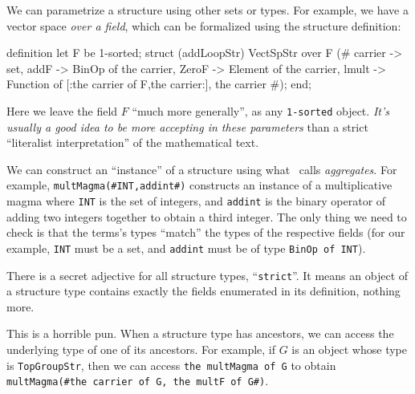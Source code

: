 \begin{node}[Structures]
\begin{node}\label{mizar-0015}%
We can parametrize a structure using other sets or types. For example,
we have a vector space \emph{over a field}, which can be formalized
using the structure definition:
\begin{mizar}
definition
  let F be 1-sorted;
  struct (addLoopStr) VectSpStr over F
  (# carrier -> set,
     addF -> BinOp of the carrier,
     ZeroF -> Element of the carrier,
     lmult -> Function of [:the carrier of F,the carrier:],
     the carrier #);
end;
\end{mizar}
Here we leave the field $F$ ``much more generally'', as any \texttt{1-sorted}
object. \emph{It's usually a good idea to be more accepting in these parameters}
than a strict ``literalist interpretation'' of the mathematical text.
\end{node}

\begin{node}[Aggregates]\label{mizar-0016}%
We can construct an ``instance'' of a structure using what \Mizar\ calls
\emph{aggregates}. For example, \verb|multMagma(#INT,addint#)|
constructs an instance of a multiplicative magma where \texttt{INT} is
the set of integers, and \texttt{addint} is the binary operator of
adding two integers together to obtain a third integer. The only thing
we need to check is that the terms's types ``match'' the types of the
respective fields (for our example, \texttt{INT} must be a set, and
\texttt{addint} must be of type \texttt{BinOp of INT}).
\end{node}

\begin{node}\label{mizar-0017}%
There is a secret adjective for all structure types, ``\texttt{strict}''.
It means an object of a structure type contains exactly the
fields enumerated in its definition, nothing more.
\end{node}

\begin{node}\label{mizar-0018}%
This is a horrible pun. When a structure type has ancestors, we can
access the underlying type of one of its ancestors. For example, if $G$
is an object whose type is \texttt{TopGroupStr}, then we can access
\texttt{the multMagma of G} to obtain
\texttt{multMagma}\verb|(#|\texttt{the carrier of G, the multF of G}\verb|#)|.
\end{node}

\begin{node}[Remarks]\label{mizar-001C}%


\end{node}
\end{node}
